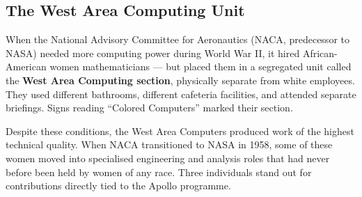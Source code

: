 \documentclass[12pt,a4paper]{article}
\begin{document}
\vspace{10pt}

\subsection{The West Area Computing Unit}

When the National Advisory Committee for Aeronautics (NACA, predecessor to NASA) needed more computing power during World War II, it hired African-American women mathematicians — but placed them in a segregated unit called the \textbf{West Area Computing section}, physically separate from white employees. They used different bathrooms, different cafeteria facilities, and attended separate briefings. Signs reading ``Colored Computers'' marked their section.

Despite these conditions, the West Area Computers produced work of the highest technical quality. When NACA transitioned to NASA in 1958, some of these women moved into specialised engineering and analysis roles that had never before been held by women of any race. Three individuals stand out for contributions directly tied to the Apollo programme.

\vspace{12pt}
\end{document}
